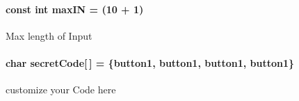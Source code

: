 \paragraph[{\texorpdfstring{max\+IN}{maxIN}}]{\setlength{\rightskip}{0pt plus 5cm}const int max\+IN = (10 + 1)}\hypertarget{TuerschlossNFC_8ino_a19fc6d5167836668952e3419f7f4d88a}{}\label{TuerschlossNFC_8ino_a19fc6d5167836668952e3419f7f4d88a}
Max length of Input 
\paragraph[{\texorpdfstring{secret\+Code}{secretCode}}]{\setlength{\rightskip}{0pt plus 5cm}char secret\+Code\mbox{[}$\,$\mbox{]} = \{{\bf button1}, {\bf button1}, {\bf button1}, {\bf button1}\}}\hypertarget{TuerschlossNFC_8ino_a13219271ff45946b1226a309506f2d01}{}\label{TuerschlossNFC_8ino_a13219271ff45946b1226a309506f2d01}
customize your Code here 